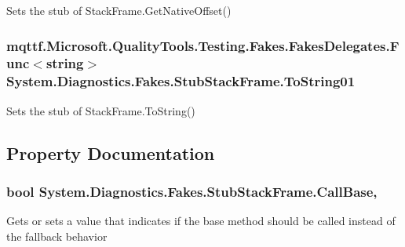 Sets the stub of Stack\-Frame.\-Get\-Native\-Offset()

\hypertarget{class_system_1_1_diagnostics_1_1_fakes_1_1_stub_stack_frame_ab36fc75b47dd428a484b4f570ccad993}{
\subsubsection[{To\-String01}]{\setlength{\rightskip}{0pt plus 5cm}mqttf.\-Microsoft.\-Quality\-Tools.\-Testing.\-Fakes.\-Fakes\-Delegates.\-Func$<$string$>$ System.\-Diagnostics.\-Fakes.\-Stub\-Stack\-Frame.\-To\-String01}}\label{class_system_1_1_diagnostics_1_1_fakes_1_1_stub_stack_frame_ab36fc75b47dd428a484b4f570ccad993}


Sets the stub of Stack\-Frame.\-To\-String()



\subsection{Property Documentation}
\hypertarget{class_system_1_1_diagnostics_1_1_fakes_1_1_stub_stack_frame_ae187de3484d602faf9fbe87d837abf7e}{
\subsubsection[{Call\-Base}]{\setlength{\rightskip}{0pt plus 5cm}bool System.\-Diagnostics.\-Fakes.\-Stub\-Stack\-Frame.\-Call\-Base\hspace{0.3cm}{\ttfamily [get]}, {\ttfamily [set]}}}\label{class_system_1_1_diagnostics_1_1_fakes_1_1_stub_stack_frame_ae187de3484d602faf9fbe87d837abf7e}


Gets or sets a value that indicates if the base method should be called instead of the fallback behavior

